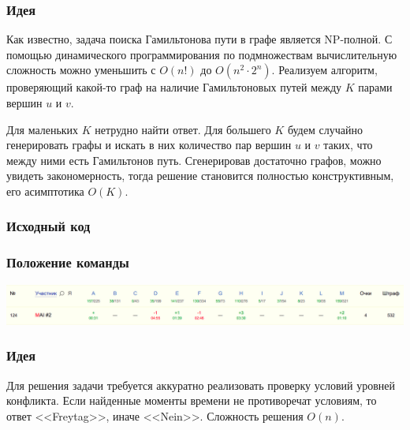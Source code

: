 
\subsubsection*{Идея}
Как известно, задача поиска Гамильтонова пути в графе является NP-полной. С помощью динамического программирования по подмножествам вычислительную сложность можно уменьшить с $O(n!)$ до $O(n ^ 2 \cdot 2 ^ n)$. Реализуем алгоритм, проверяющий какой-то граф на наличие Гамильтоновых путей между $K$ парами вершин $u$ и $v$.

Для маленьких $K$ нетрудно найти ответ. Для большего $K$ будем случайно генерировать графы и искать в них количество пар вершин $u$ и $v$ таких, что между ними есть Гамильтонов путь. Сгенерировав достаточно графов, можно увидеть закономерность, тогда решение становится полностью конструктивным, его асимптотика $O(K)$.

\subsubsection*{Исходный код}

\subsubsection*{Положение команды}
\includegraphics[scale=0.25]{images/gp_imo.png}\newline\noindent
\pagebreak


\subsubsection*{Идея}
Для решения задачи требуется аккуратно реализовать проверку условий уровней конфликта. Если найденные моменты времени не противоречат условиям, то ответ <<Freytag>>, иначе <<Nein>>. Сложность решения $O(n)$.

